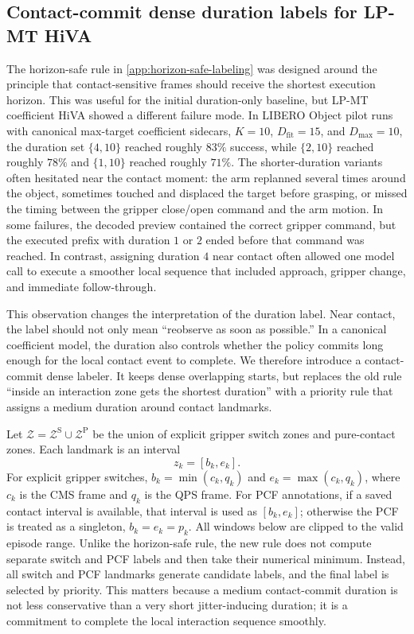 \documentclass[10pt,twocolumn,letterpaper]{article}
\begin{document}
\subsection{Contact-commit dense duration labels for LP-MT HiVA}
\label{app:contact-commit-duration-labeling}
The horizon-safe rule in \cref{app:horizon-safe-labeling} was designed around the principle that contact-sensitive frames should receive the shortest execution horizon. This was useful for the initial duration-only baseline, but LP-MT coefficient HiVA showed a different failure mode. In LIBERO Object pilot runs with canonical max-target coefficient sidecars, $K=10$, $D_{\mathrm{fit}}=15$, and $D_{\max}=10$, the duration set $\{4,10\}$ reached roughly $83\%$ success, while $\{2,10\}$ reached roughly $78\%$ and $\{1,10\}$ reached roughly $71\%$. The shorter-duration variants often hesitated near the contact moment: the arm replanned several times around the object, sometimes touched and displaced the target before grasping, or missed the timing between the gripper close/open command and the arm motion. In some failures, the decoded preview contained the correct gripper command, but the executed prefix with duration $1$ or $2$ ended before that command was reached. In contrast, assigning duration $4$ near contact often allowed one model call to execute a smoother local sequence that included approach, gripper change, and immediate follow-through.

This observation changes the interpretation of the duration label. Near contact, the label should not only mean ``reobserve as soon as possible.'' In a canonical coefficient model, the duration also controls whether the policy commits long enough for the local contact event to complete. We therefore introduce a contact-commit dense labeler. It keeps dense overlapping starts, but replaces the old rule ``inside an interaction zone gets the shortest duration'' with a priority rule that assigns a medium duration around contact landmarks.

Let $\mathcal{Z}=\mathcal{Z}^{\mathrm{S}}\cup\mathcal{Z}^{\mathrm{P}}$ be the union of explicit gripper switch zones and pure-contact zones. Each landmark is an interval
\begin{equation}
    z_k=[b_k,e_k].
\end{equation}
For explicit gripper switches, $b_k=\min(c_k,q_k)$ and $e_k=\max(c_k,q_k)$, where $c_k$ is the CMS frame and $q_k$ is the QPS frame. For PCF annotations, if a saved contact interval is available, that interval is used as $[b_k,e_k]$; otherwise the PCF is treated as a singleton, $b_k=e_k=p_k$. All windows below are clipped to the valid episode range. Unlike the horizon-safe rule, the new rule does not compute separate switch and PCF labels and then take their numerical minimum. Instead, all switch and PCF landmarks generate candidate labels, and the final label is selected by priority. This matters because a medium contact-commit duration is not less conservative than a very short jitter-inducing duration; it is a commitment to complete the local interaction sequence smoothly.
\end{document}
